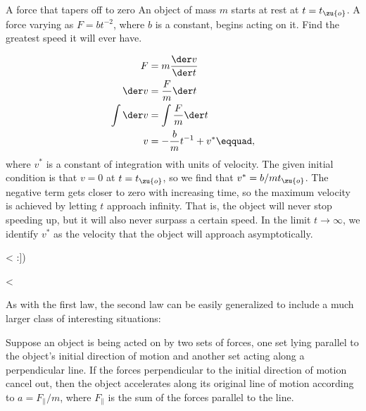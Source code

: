 \begin{eg}{A force that tapers off to zero}
\egquestion An object of mass $m$ starts at rest at $t=t_\zu{o}$. 
A force varying as $F=bt^{-2}$,
where $b$ is a constant, begins acting on it. Find the greatest speed it will
ever have.

\eganswer
\begin{align*}
F &= m\frac{\der v}{\der t} \\
\der v &= \frac{F}{m} \der t \\
\int \der v &= \int \frac{F}{m} \der t\\
v  &= -\frac{b}{m}t^{-1}+v^*\eqquad,
\end{align*}
where $v^*$ is a constant of integration with units of velocity.
The given initial condition is that $v=0$ at $t=t_\zu{o}$, so we find that $v^*=b/mt_\zu{o}$. The negative term gets closer
to zero with increasing time, so the maximum velocity is achieved by letting $t$ approach infinity. That is, the
object will never stop speeding up, but it will also never surpass a certain speed. In the limit $t\rightarrow\infty$,
we identify $v^*$ as the velocity that the object will approach asymptotically.
\end{eg}

<%
:])

<%

As with the first law, the second law can be easily
generalized to include a much larger class of interesting situations:\label{generalization-of-second-law}

\begin{lessimportant}
Suppose an object is being acted on by two sets of forces,
one set lying parallel to the object's initial direction of motion
and another set acting along a perpendicular line. If the
forces perpendicular to the initial direction of motion
cancel out, then the object accelerates along its original
line of motion according to $a=F_\parallel/m$,
where $F_\parallel$ is the sum of the forces parallel to the line.
\end{lessimportant}

